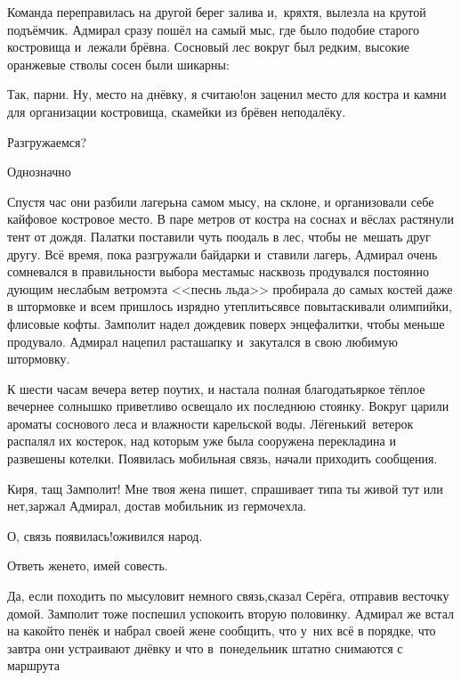 Команда переправилась на другой берег залива и,~кряхтя, вылезла на крутой подъёмчик. Адмирал сразу пошёл на самый мыс, где было подобие старого костровища и~лежали брёвна. Сосновый лес вокруг был редким, высокие оранжевые стволы сосен были шикарны:

\diagdash Так, парни. Ну, место на днёвку, я считаю!\mdash он заценил место для костра и камни для организации костровища, скамейки из брёвен неподалёку.

\diagdash Разгружаемся?

\diagdash Однозначно\myldots{}

\vspace{0.5cm}
\myldots{}Спустя час они разбили лагерь\mdash на самом мысу, на склоне, и организовали себе кайфовое костровое место. В паре метров от костра на соснах и вёслах растянули тент от дождя. Палатки поставили чуть поодаль в лес, чтобы не~мешать друг другу. Всё время, пока разгружали байдарки и~ставили лагерь, Адмирал очень сомневался в правильности выбора места\mdash мыс насквозь продувался постоянно дующим неслабым ветром\mdash эта <<песнь льда>> пробирала до самых костей даже в штормовке и всем пришлось изрядно утеплиться\mdash все повытаскивали олимпийки, флисовые кофты. Замполит надел дождевик поверх энцефалитки, чтобы меньше продувало. Адмирал нацепил раста\sdash шапку и~закутался в свою любимую штормовку.

К шести часам вечера ветер поутих, и настала полная благодать\mdash яркое тёплое вечернее солнышко приветливо освещало их последнюю стоянку. Вокруг царили ароматы соснового леса и влажности карельской воды. Лёгенький~ветерок распалял их костерок, над которым уже была сооружена перекладина и развешены котелки. Появилась мобильная связь, начали приходить сообщения.

\diagdash Киря, тащ Замполит! Мне твоя жена пишет, спрашивает типа ты живой тут или нет,\mdash заржал Адмирал, достав мобильник из гермочехла.

\diagdash О, связь появилась!\mdash оживился народ.

\diagdash Ответь жене\sdash то, имей совесть.

\diagdash Да, если походить по мысу\mdash ловит немного связь,\mdash сказал Серёга, отправив весточку домой. Замполит тоже поспешил успокоить вторую половинку. Адмирал же встал на какой\sdash то пенёк и набрал своей жене сообщить, что у~них всё в порядке, что завтра они устраивают днёвку и что в~понедельник штатно снимаются с маршрута\myldots{}

